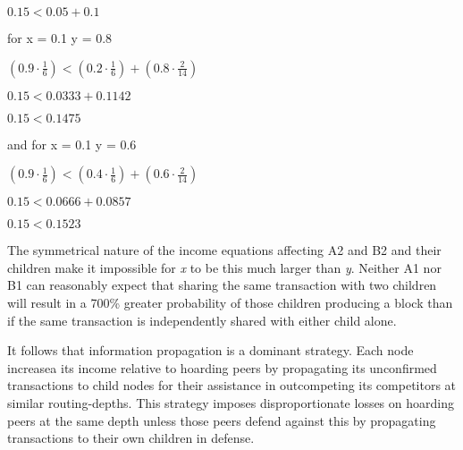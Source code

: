 \documentclass[oneside]{article}   	%
\begin{document}
\begin{multicols}{2}
\begin{adjustwidth}{1.5em}{1.5em}
	\begin{math}
0.15 < 0.05 + 0.1
	\end{math}
\end{adjustwidth}
\normalsize

for x = 0.1 y = 0.8

\normalsize
\begin{adjustwidth}{1.5em}{1.5em} 
	\begin{math}
\left( 0.9 \cdot \frac{1}{6} \right) < \left( 0.2 \cdot \frac{1}{6} \right) + \left( 0.8 \cdot \frac{2}{14} \right)
	\end{math}

	\begin{math}
0.15 < 0.0333 + 0.1142
	\end{math}

	\begin{math}
0.15 < 0.1475
	\end{math}
\end{adjustwidth}
\normalsize

and for x = 0.1 y = 0.6

\normalsize
\begin{adjustwidth}{1.5em}{1.5em} 
	\begin{math}
\left( 0.9 \cdot \frac{1}{6} \right) < \left( 0.4 \cdot \frac{1}{6} \right) + \left( 0.6 \cdot \frac{2}{14} \right)
	\end{math}

	\begin{math}
0.15 < 0.0666 + 0.0857
	\end{math}

	\begin{math}
0.15 < 0.1523
	\end{math}
\end{adjustwidth}
\normalsize

The symmetrical nature of the income equations affecting A2 and B2 and their children make it impossible for \textit{x} to be this much larger than \textit{y}. Neither A1 nor B1 can reasonably expect that sharing the same transaction with two children will result in a 700\% greater probability of those children producing a block than if the same transaction is independently shared with either child alone.

It follows that information propagation is a dominant strategy. Each node increasea its income relative to hoarding peers by propagating its unconfirmed transactions to child nodes for their assistance in outcompeting its competitors at similar routing-depths. This strategy imposes disproportionate losses on hoarding peers at the same depth unless those peers defend against this by propagating transactions to their own children in defense.


\end{multicols}
\end{document}
